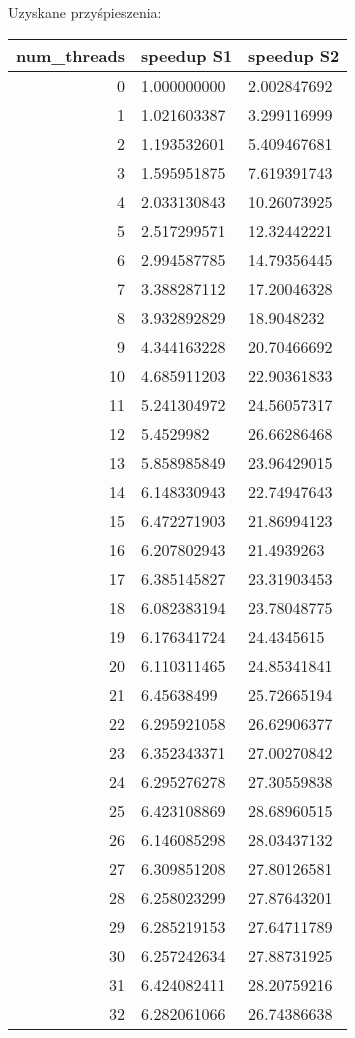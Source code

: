 \documentclass[a4paper,12pt]{scrartcl}
\begin{document}
\newpage
Uzyskane przyśpieszenia:

\begin{tabular}{|r|l|l|}
num\_threads & speedup S1 & speedup S2 \\  \hline 
0  & 1.000000000 & 2.002847692  \\ \hline 
1  & 1.021603387 & 3.299116999  \\ \hline 
2  & 1.193532601 & 5.409467681  \\ \hline
3  & 1.595951875 & 7.619391743  \\ \hline
4  & 2.033130843 & 10.26073925  \\ \hline
5  & 2.517299571 & 12.32442221  \\ \hline
6  & 2.994587785 & 14.79356445  \\ \hline
7  & 3.388287112 & 17.20046328  \\ \hline
8  & 3.932892829 & 18.9048232  \\ \hline
9  & 4.344163228 & 20.70466692  \\ \hline
10 & 4.685911203 & 22.90361833  \\ \hline
11 & 5.241304972 & 24.56057317  \\ \hline
12 & 5.4529982 & 26.66286468  \\ \hline
13 & 5.858985849 & 23.96429015  \\ \hline
14 & 6.148330943 & 22.74947643  \\ \hline
15 & 6.472271903 & 21.86994123  \\ \hline
16 & 6.207802943 & 21.4939263  \\ \hline
17 & 6.385145827 & 23.31903453  \\ \hline
18 & 6.082383194 & 23.78048775  \\ \hline
19 & 6.176341724 & 24.4345615  \\ \hline
20 & 6.110311465 & 24.85341841  \\ \hline
21 & 6.45638499 & 25.72665194  \\ \hline
22 & 6.295921058 & 26.62906377  \\ \hline
23 & 6.352343371 & 27.00270842  \\ \hline
24 & 6.295276278 & 27.30559838  \\ \hline
25 & 6.423108869 & 28.68960515  \\ \hline
26 & 6.146085298 & 28.03437132  \\ \hline
27 & 6.309851208 & 27.80126581  \\ \hline
28 & 6.258023299 & 27.87643201  \\ \hline
29 & 6.285219153 & 27.64711789  \\ \hline
30 & 6.257242634 & 27.88731925  \\ \hline
31 & 6.424082411 & 28.20759216  \\ \hline
32 & 6.282061066 & 26.74386638  \\ \hline
\end{tabular} 
\end{document}
